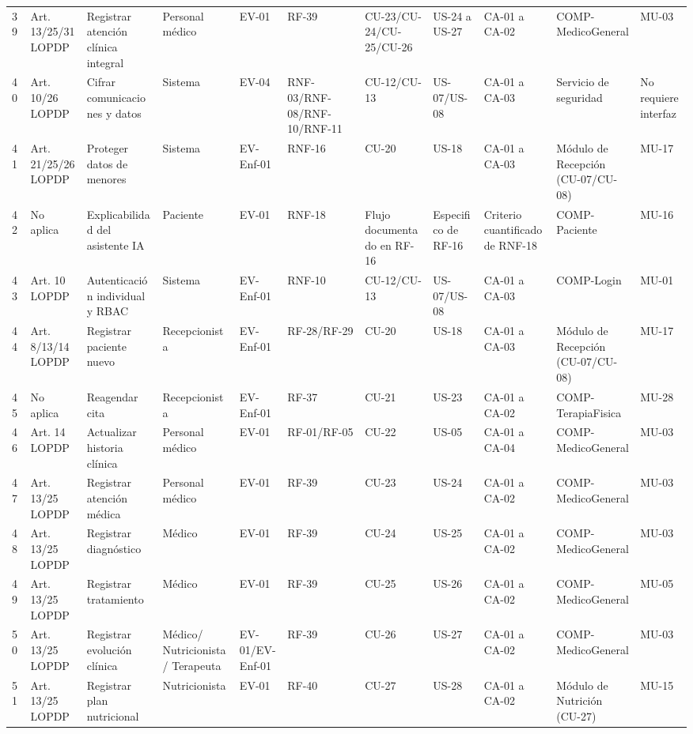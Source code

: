 \documentclass[11pt,a4paper]{article}
\begin{document}
\begin{longtable}{p{} p{} p{} p{} p{} p{} p{} p{} p{} p{} p{}}
		39 & Art. 13/25/31 LOPDP & Registrar atención clínica integral & Personal médico & EV-01 & RF-39 & CU-23/CU-24/CU-25/CU-26 & US-24 a US-27 & CA-01 a CA-02 & COMP-MedicoGeneral & MU-03 \\
		40 & Art. 10/26 LOPDP & Cifrar comunicaciones y datos & Sistema & EV-04 & RNF-03/RNF-08/RNF-10/RNF-11 & CU-12/CU-13 & US-07/US-08 & CA-01 a CA-03 & Servicio de seguridad & No requiere interfaz \\
		41 & Art. 21/25/26 LOPDP & Proteger datos de menores & Sistema & EV-Enf-01 & RNF-16 & CU-20 & US-18 & CA-01 a CA-03 & Módulo de Recepción (CU-07/CU-08) & MU-17 \\
		42 & No aplica & Explicabilidad del asistente IA & Paciente & EV-01 & RNF-18 & Flujo documentado en RF-16 & Especifico 
		de RF-16 & Criterio cuantificado de RNF-18 & COMP-Paciente & MU-16 \\
		43 & Art. 10 LOPDP & Autenticación individual y RBAC & Sistema & EV-Enf-01 & RNF-10 & CU-12/CU-13 & US-07/US-08 & CA-01 a CA-03 & COMP-Login & MU-01 \\
		44 & Art. 8/13/14 LOPDP & Registrar paciente nuevo & Recepcionista & EV-Enf-01 & RF-28/RF-29 & CU-20 & US-18 & CA-01 a CA-03 & Módulo de Recepción (CU-07/CU-08) & MU-17 \\
		45 & No aplica & Reagendar cita & Recepcionista & EV-Enf-01 & RF-37 & CU-21 & US-23 & CA-01 a CA-02 & COMP-TerapiaFisica & MU-28 \\
		46 & Art. 14 LOPDP & Actualizar historia clínica & Personal médico & EV-01 & RF-01/RF-05 & CU-22 & US-05 & CA-01 a CA-04 & COMP-MedicoGeneral & MU-03 \\
		47 & Art. 13/25 LOPDP & Registrar atención médica & Personal médico & EV-01 & RF-39 & CU-23 & US-24 & CA-01 a CA-02 & COMP-MedicoGeneral & MU-03 \\
		48 & Art. 13/25 LOPDP & Registrar diagnóstico & Médico & EV-01 & RF-39 & CU-24 & US-25 & CA-01 a CA-02 & COMP-MedicoGeneral & MU-03 \\
		49 & Art. 13/25 LOPDP & Registrar tratamiento & Médico & EV-01 & RF-39 & CU-25 & US-26 & CA-01 a CA-02 & COMP-MedicoGeneral & MU-05 \\
		50 & Art. 13/25 LOPDP & Registrar evolución clínica & Médico/
		Nutricionista/
		Terapeuta & EV-01/EV-Enf-01 & RF-39 & CU-26 & US-27 & CA-01 a CA-02 & COMP-MedicoGeneral & MU-03 \\
		51 & Art. 13/25 LOPDP & Registrar plan nutricional & Nutricionista & EV-01 & RF-40 & CU-27 & US-28 & CA-01 a CA-02 & Módulo de Nutrición (CU-27) & MU-15 \\

\end{longtable}
\end{document}
